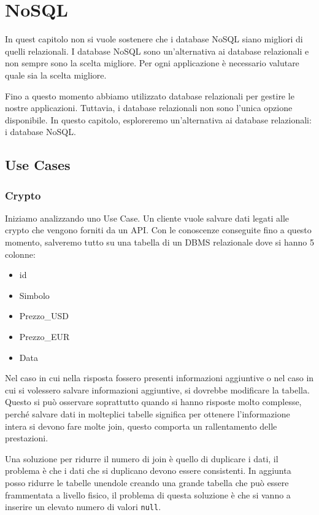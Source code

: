\chapter{NoSQL}
\begin{nota}
    In quest capitolo non si vuole sostenere che i database NoSQL siano
    migliori di quelli relazionali. I database NoSQL sono un'alternativa
    ai database relazionali e non sempre sono la scelta migliore. Per ogni
    applicazione è necessario valutare quale sia la scelta migliore.
\end{nota}
Fino a questo momento abbiamo utilizzato database relazionali per gestire le
nostre applicazioni. Tuttavia, i database relazionali non sono l'unica
opzione disponibile. In questo capitolo, esploreremo un'alternativa ai
database relazionali: i database NoSQL.
\section*{Use Cases}
\subsection*{Crypto}
Iniziamo analizzando uno Use Case. Un cliente vuole salvare dati legati alle
crypto che vengono forniti da un API. Con le conoscenze conseguite fino a questo
momento, salveremo tutto su una tabella di un DBMS relazionale dove si hanno 5 colonne:
\begin{itemize}
    \item id
    \item Simbolo
    \item Prezzo\_USD
    \item Prezzo\_EUR
    \item Data
\end{itemize}
Nel caso in cui nella risposta fossero presenti informazioni aggiuntive o nel caso
in cui si volessero salvare informazioni aggiuntive, si dovrebbe modificare la
tabella. Questo si può osservare soprattutto quando si hanno risposte molto
complesse, perché salvare dati in molteplici tabelle significa per ottenere
l'informazione intera si devono fare molte join, questo comporta un rallentamento
delle prestazioni.

Una soluzione per ridurre il numero di join è quello di duplicare i dati, il
problema è che i dati che si duplicano devono essere consistenti. In aggiunta
posso ridurre le tabelle unendole creando una grande tabella che può essere
frammentata a livello fisico, il problema di questa soluzione è che si vanno a
inserire un elevato numero di valori \texttt{null}.
